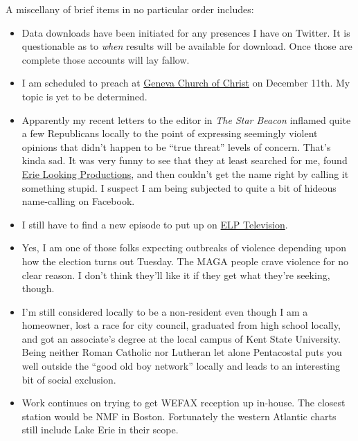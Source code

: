 A miscellany of brief items in no particular order includes:

\begin{itemize}
\tightlist
\item
  Data downloads have been initiated for any presences I have on
  Twitter. It is questionable as to \emph{when} results will be
  available for download. Once those are complete those accounts will
  lay fallow.
\item
  I am scheduled to preach at
  \href{https://www.genevachurchofchrist.org/}{Geneva Church of Christ}
  on December 11th. My topic is yet to be determined.
\item
  Apparently my recent letters to the editor in \emph{The Star Beacon}
  inflamed quite a few Republicans locally to the point of expressing
  seemingly violent opinions that didn't happen to be ``true threat''
  levels of concern. That's kinda sad. It was very funny to see that
  they at least searched for me, found
  \href{https://erielookingproductions.info}{Erie Looking Productions},
  and then couldn't get the name right by calling it something stupid. I
  suspect I am being subjected to quite a bit of hideous name-calling on
  Facebook.
\item
  I still have to find a new episode to put up on
  \href{https://coyote.works/}{ELP Television}.
\item
  Yes, I am one of those folks expecting outbreaks of violence depending
  upon how the election turns out Tuesday. The MAGA people crave
  violence for no clear reason. I don't think they'll like it if they
  get what they're seeking, though.
\item
  I'm still considered locally to be a non-resident even though I am a
  homeowner, lost a race for city council, graduated from high school
  locally, and got an associate's degree at the local campus of Kent
  State University. Being neither Roman Catholic nor Lutheran let alone
  Pentacostal puts you well outside the ``good old boy network'' locally
  and leads to an interesting bit of social exclusion.
\item
  Work continues on trying to get WEFAX reception up in-house. The
  closest station would be NMF in Boston. Fortunately the western
  Atlantic charts still include Lake Erie in their scope.


\end{itemize}
